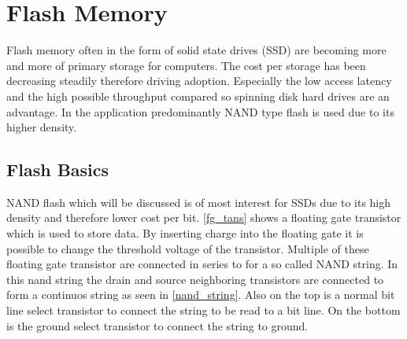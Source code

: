 
\chapter{Flash Memory}
Flash memory often in the form of solid state drives (SSD) are becoming more and more of primary storage for computers. The cost per storage has been decreasing steadily therefore driving adoption. Especially the low access latency and the high possible throughput compared so spinning disk hard drives are an advantage. In the application predominantly NAND type flash is used due to its higher density. 


\section{Flash Basics}
NAND flash which will be discussed is of most interest for SSDs due to its high density and therefore lower cost per bit. \cref{fg_tans} shows a floating gate transistor which is used to store data. By inserting charge into the floating gate it is possible to change the threshold voltage of the transistor. Multiple of these floating gate transistor are connected in series to for a so called NAND string. In this nand string the drain and source neighboring transistors are connected to form a continuos string as seen in \cref{nand_string}. Also on the top is a normal bit line select transistor to connect the string to be read to a bit line. On the bottom is the ground select transistor to connect the string to ground\cite[p.~22-24]{MiMa18}.

